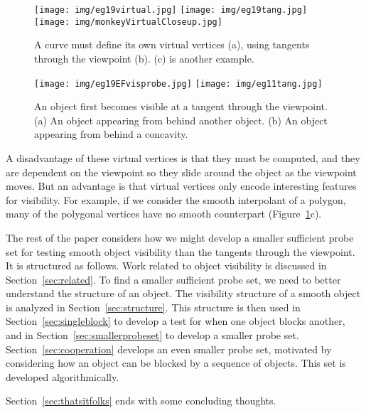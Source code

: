 \documentclass[10pt,twocolumn]{article}
\newif\ifJournal
\begin{document}
\begin{figure}
\begin{center}
\texttt{[image: img/eg19virtual.jpg]}
\texttt{[image: img/eg19tang.jpg]}
\texttt{[image: img/monkeyVirtualCloseup.jpg]}
\end{center}
\caption{A curve must define its own virtual vertices (a), using tangents through the 
         viewpoint (b).  (c) is another example.}
\label{fig:monkey}
\end{figure}

\begin{figure}
\begin{center}
\texttt{[image: img/eg19EFvisprobe.jpg]}
\texttt{[image: img/eg11tang.jpg]}
\end{center}
\caption{An object first becomes visible at a tangent through the viewpoint.
        (a) An object appearing from behind another object.
        (b) An object appearing from behind a concavity.}
\label{fig:appearing}
\end{figure}

A disadvantage of these virtual vertices is that they must be computed,
and they are dependent on the viewpoint so they slide around the object as the
viewpoint moves.
But an advantage 
is that virtual vertices only encode interesting features for visibility.
For example, if we consider the smooth interpolant of a polygon, many of the polygonal
vertices have no smooth counterpart (Figure~\ref{fig:monkey}c).

The rest of the paper considers how we might develop a smaller sufficient probe set
for testing smooth object visibility than the tangents through the viewpoint.
It is structured as follows.
Work related to object visibility is discussed in Section~\ref{sec:related}.
To find a smaller sufficient probe set, 
we need to better understand the structure of an object.
The visibility structure of a smooth object is analyzed in Section~\ref{sec:structure}.
This structure is then used in Section~\ref{sec:singleblock} to develop a test for when 
one object blocks another, and in Section~\ref{sec:smallerprobeset} 
to develop a smaller probe set.
Section~\ref{sec:cooperation} develops an even smaller probe set,
motivated by considering how an object can be blocked by a sequence of objects.
This set is developed algorithmically.
\ifJournal %
A proof of the sufficiency of this probe set is given.
Section~\ref{sec:eg} provides examples to illustrate 
our analysis of smooth object visibility.
Section~\ref{sec:complexity} analyzes the complexity of the three probing strategies, and
\fi
Section~\ref{sec:thatsitfolks} ends with some concluding thoughts.
\ifJournal An appendix solves an important subproblem: does a point lie inside a concavity? \fi
\end{document}
